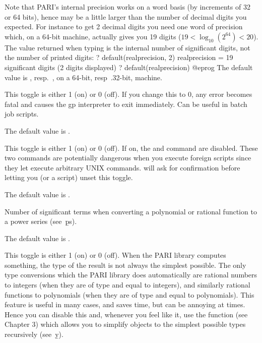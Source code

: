Note that PARI's internal precision works on a word basis (by increments of
32 or 64 bits), hence may be a little larger than the number of decimal
digits you expected. For instance to get 2 decimal digits you need one word
of precision which, on a 64-bit machine, actually gives you 19 digits ($19 <
\log_{10}(2^{64}) < 20$). The value returned when typing
 is the internal number of significant digits,
not the number of printed digits:
\bprog
? default(realprecision, 2)
      realprecision = 19 significant digits (2 digits displayed)
? default(realprecision)
@eprog
The default value is , resp.~, on a 64-bit, resp~.32-bit,
machine.

\label{se:def,recover}
This toggle is either 1 (on) or 0 (off). If you change this to $0$, any
error becomes fatal and causes the gp interpreter to exit immediately. Can be
useful in batch job scripts.

The default value is .

\label{se:def,secure}
This toggle is either 1 (on) or 0 (off). If on, the  and
 command are disabled. These two commands are potentially
dangerous when you execute foreign scripts since they let  execute
arbitrary UNIX commands.  will ask for confirmation before letting
you (or a script) unset this toggle.

The default value is .

\label{se:def,seriesprecision}
Number of significant terms
when converting a polynomial or rational function to a power series
(see~\b{ps}).

The default value is .

\label{se:def,simplify}
This toggle is either 1 (on) or 0 (off). When the PARI library computes
something, the type of the
result is not always the simplest possible. The only type conversions which
the PARI library does automatically are rational numbers to integers (when
they are of type  and equal to integers), and similarly rational
functions to polynomials (when they are of type  and equal to
polynomials). This feature is useful in many cases, and saves time, but can
be annoying at times. Hence you can disable this and, whenever you feel like
it, use the function  (see Chapter 3) which allows you to
simplify objects to the simplest possible types recursively (see~\b{y}).

